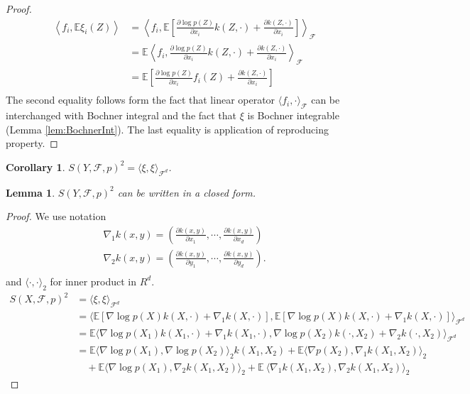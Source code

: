 \documentclass{article}
\newtheorem{lemma}{Lemma}
\newtheorem{corollary}{Corollary}
\newcommand{\ev}{\mathbb{E}}
\begin{document}
\begin{proof}
  \begin{align*}
 \left\langle f_i, \ev \xi_i(Z) \right\rangle  &= \left\langle f_i,\ev \left[ \frac{\partial \log p(Z)}{ \partial x_i} k(Z,\cdot)+ \frac{\partial k(Z,\cdot)}{ \partial x_i}\right]\right\rangle_{\mathcal{F}} \\
  &= \ev \left\langle f_i, \frac{\partial \log p(Z)}{ \partial x_i} k(Z,\cdot)+ \frac{\partial k(Z,\cdot)}{ \partial x_i}\right\rangle_{\mathcal{F}} \\
 &=\ev \left[ \frac{\partial \log p(Z)}{ \partial x_i} f_i(Z)+ \frac{\partial k(Z,\cdot)}{ \partial x_i}\right]\\
\end{align*}
The second equality follows form the fact that linear operator $\langle f_i , \cdot \rangle_{\mathcal{F}}$ can be interchanged with Bochner integral and the fact that $\xi$ is Bochner integrable (Lemma \ref{lem:BochnerInt}). The last equality is application of reproducing property.    
\end{proof}

\begin{corollary}
$S(Y,\mathcal{F},p)^2 = \langle \xi, \xi \rangle_{\mathcal{F}^d } $. 
\end{corollary}


\begin{lemma}
\label{th1}
$S(Y,\mathcal{F},p)^2$ can be written in a closed form. 
\end{lemma}

\begin{proof}
We use notation 
\begin{align*}
 \nabla_1 k(x,y) = \left( \frac{\partial k(x,y) }{\partial x_1}, \cdots, \frac{\partial k(x,y) }{\partial x_d} \right) \\
 \nabla_2 k(x,y) = \left( \frac{\partial k(x,y) }{\partial y_1}, \cdots, \frac{\partial k(x,y) }{\partial y_d} \right). \\ 
\end{align*}
and $\langle \cdot, \cdot\rangle_2 $ for inner product in $R^d$.
\begin{align*}
S(X,\mathcal{F},p)^2 & = \langle \xi, \xi \rangle_{\mathcal{F}^d } \\
& = \langle \ev \left[\nabla \log p(X) k(X,\cdot)+\nabla_1 k(X,\cdot)\right] ,\ev \left[\nabla \log p(X) k(X,\cdot)+\nabla_1 k(X,\cdot)\right] \rangle_{\mathcal{F}^d } \\
& = \ev \langle   \nabla \log p(X_1) k(X_1,\cdot) + \nabla_1 k(X_1,\cdot) , \nabla \log p(X_2) k(\cdot,X_2) + \nabla_2 k(\cdot,X_2) \rangle_{\mathcal{F}^d } \\
& = \ev\langle \nabla \log p(X_1) , \nabla\log p(X_2) \rangle_{2} k(X_1,X_2) + \ev \langle \nabla p(X_2),  \nabla_1 k(X_1,X_2) \rangle_{2} \\
  & \quad +  \ev \langle \nabla  \log p(X_1), \nabla_{2}  k(X_1,X_2) \rangle_{2} +  \ev\ \langle  \nabla_1 k(X_1,X_2), \nabla_2 k(X_1,X_2) \rangle_{2}
\end{align*}



\end{proof}
\end{document}
